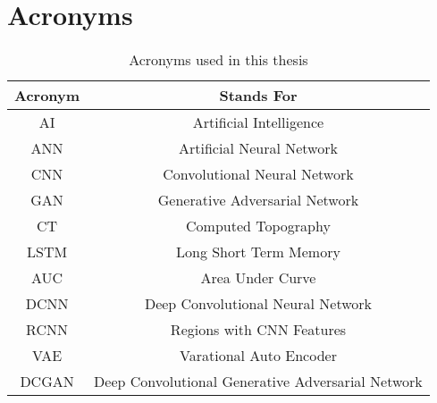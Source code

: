 
\chapter*{Acronyms}
\begin{table}[h]
    \centering
    \begin{tabular}{|c|c|}
        \hline
         Acronym
         &  Stands For\\
        \hline
        AI & Artificial Intelligence\\
        ANN & Artificial Neural Network\\
        CNN & Convolutional Neural Network\\
        GAN & Generative Adversarial Network\\
        CT & Computed Topography\\
        LSTM & Long Short Term Memory\\
        AUC & Area Under Curve\\
        DCNN & Deep Convolutional Neural Network\\
        RCNN & Regions with CNN Features\\
        VAE & Varational Auto Encoder\\
        DCGAN & Deep Convolutional Generative Adversarial Network\\
        \hline
    \end{tabular}
    \caption{Acronyms used in this thesis}
    \label{tab:Table of Acronyms}

\end{table}
 

